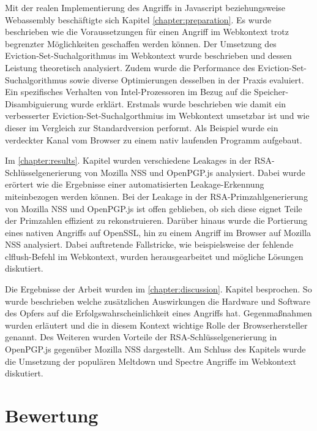 Mit der realen Implementierung des Angriffs in Javascript beziehungsweise Webassembly beschäftigte sich Kapitel \ref{chapter:preparation}.
Es wurde beschrieben wie die Voraussetzungen für einen Angriff im Webkontext trotz begrenzter Möglichkeiten geschaffen werden können.
Der Umsetzung des Eviction-Set-Suchalgorithmus im Webkontext wurde beschrieben und dessen Leistung theoretisch analysiert.
Zudem wurde die Performance des Eviction-Set-Suchalgorithmus sowie diverse Optimierungen desselben in der Praxis evaluiert.
Ein spezifisches Verhalten von Intel-Prozessoren im Bezug auf die Speicher-Disambiguierung wurde erklärt.
Erstmals wurde beschrieben wie damit ein verbesserter Eviction-Set-Suchalgorthmius im Webkontext umsetzbar ist und wie dieser im Vergleich zur Standardversion performt.
Als Beispiel wurde ein verdeckter Kanal vom Browser zu einem nativ laufenden Programm aufgebaut.

\par \medskip                      

Im \ref{chapter:results}. Kapitel wurden verschiedene Leakages in der RSA-Schlüsselgenerierung von Mozilla NSS und OpenPGP.js analysiert.
Dabei wurde erörtert wie die Ergebnisse einer automatisierten Leakage-Erkennung miteinbezogen werden können.
Bei der Leakage in der RSA-Primzahlgenerierung von Mozilla NSS und OpenPGP.js ist offen geblieben, ob sich diese eignet Teile der Primzahlen effizient zu rekonstruieren.
Darüber hinaus wurde die Portierung eines nativen Angriffs auf OpenSSL, hin zu einem Angriff im Browser auf Mozilla NSS analysiert.
Dabei auftretende Fallstricke, wie beispielsweise der fehlende clflush-Befehl im Webkontext, wurden herausgearbeitet und mögliche Lösungen diskutiert.

\par \medskip                       

Die Ergebnisse der Arbeit wurden im \ref{chapter:discussion}. Kapitel besprochen.
So wurde beschrieben welche zusätzlichen Auswirkungen die Hardware und Software des Opfers auf die Erfolgswahrscheinlichkeit eines Angriffs hat.
Gegenmaßnahmen wurden erläutert und die in diesem Kontext wichtige Rolle der Browserhersteller genannt.
Des Weiteren wurden Vorteile der RSA-Schlüsselgenerierung in OpenPGP.js gegenüber Mozilla NSS dargestellt.
Am Schluss des Kapitels wurde die Umsetzung der populären Meltdown und Spectre Angriffe im Webkontext diskutiert.

\section{Bewertung}

